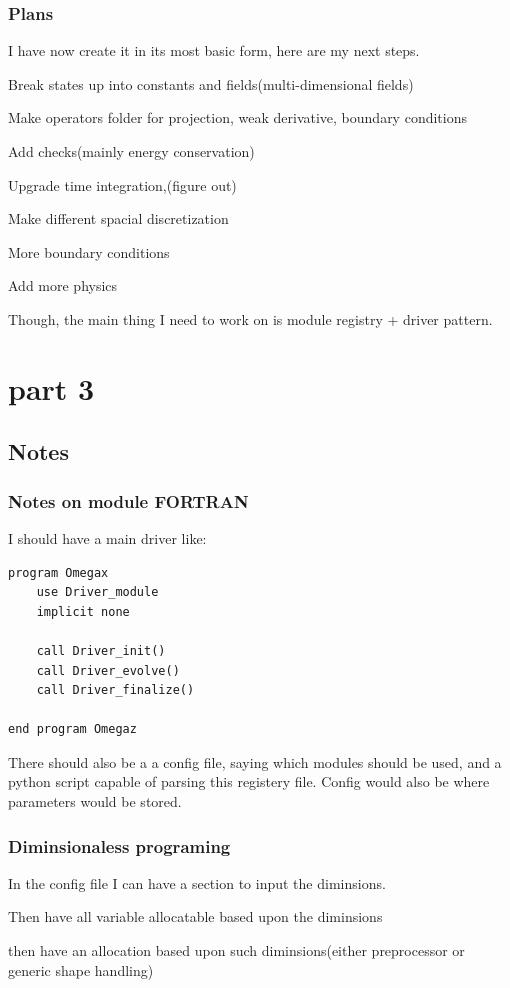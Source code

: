 \subsubsection{Plans}
I have now create it in its most basic form, here are my next steps.

Break states up into constants and fields(multi-dimensional fields)

Make operators folder for projection, weak derivative, boundary conditions

Add checks(mainly energy conservation)

Upgrade time integration,(figure out)

Make different spacial discretization

More boundary conditions

Add more physics

Though, the main thing I need to work on is module registry + driver pattern. 
\section{part 3}
\subsection{Notes}
\subsubsection{Notes on module FORTRAN}
I should have a main driver like:
\begin{lstlisting}[style=FORTRAN, caption=Omegax.f90]
program Omegax
	use Driver_module
	implicit none

	call Driver_init()
	call Driver_evolve()
	call Driver_finalize()

end program Omegaz
\end{lstlisting}

There should also be a a config file, saying which modules should be used, and a python script capable of parsing this registery file.
Config would also be where parameters would be stored.
\subsubsection{Diminsionaless programing}
In the config file I can have a section to input the diminsions.

Then have all variable allocatable based upon the diminsions

then have an allocation based upon such diminsions(either preprocessor or generic shape handling)

